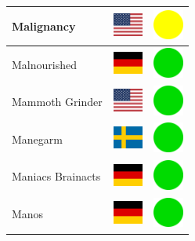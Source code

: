 \documentclass[12pt, a4paper, twoside]{report}
\begin{document}
\begin{center}
\begin{longtable}{|p{5cm}|p{2cm}|p{2cm}|}
 Malignancy                                                 & \includegraphics[width=1cm]{../img/flags/us} &   \includegraphics[width=1cm]{../likes/m} \\ \hline
 Malnourished                                               & \includegraphics[width=1cm]{../img/flags/de} &   \includegraphics[width=1cm]{../likes/y} \\ \hline
 Mammoth Grinder                                            & \includegraphics[width=1cm]{../img/flags/us} &   \includegraphics[width=1cm]{../likes/y} \\ \hline
 Manegarm                                                   & \includegraphics[width=1cm]{../img/flags/se} &   \includegraphics[width=1cm]{../likes/y} \\ \hline
 Maniacs Brainacts                                          & \includegraphics[width=1cm]{../img/flags/de} &   \includegraphics[width=1cm]{../likes/y} \\ \hline
 Manos                                                      & \includegraphics[width=1cm]{../img/flags/de} &   \includegraphics[width=1cm]{../likes/y} \\ \hline

\end{longtable}
\end{center}
\end{document}

